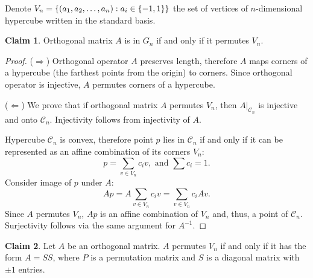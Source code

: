 \documentclass{article}
\theoremstyle{definition}
\newtheorem*{claim}{Claim}
\DeclarePairedDelimiter\set{\{}{\}}
\newcommand{\restrict}[1]{ \big|_{#1} }
\begin{document}
Denote $V_n = \set{ (a_1, a_2, \dots, a_n) : a_i \in \set{-1,1}}$ the set of vertices of $n$-dimensional hypercube written in the standard basis.

\begin{claim}
Orthogonal matrix $A$ is in $G_n$ if and only if it permutes $V_n$.
\end{claim}

\begin{proof}

($\Longrightarrow$)
Orthogonal operator $A$ preserves length, therefore $A$ maps corners of a hypercube (the farthest points from the origin) to corners.
Since orthogonal operator is injective, $A$ permutes corners of a hypercube.

($\Longleftarrow$)
We prove that if orthogonal matrix $A$ permutes $V_n$, then $A\restrict{\mathcal{C}_n}$ is injective and onto $\mathcal{C}_n$.
Injectivity follows from injectivity of $A$.

Hypercube $\mathcal{C}_n$ is convex, therefore point $p$ lies in $\mathcal{C}_n$ if and only if it can be represented as an affine combination of its corners $V_n$:
\[ p = \sum_{v \in V_n} c_i v, \text{ and } \sum c_i = 1. \]
Consider image of $p$ under $A$:
\[ Ap = A \sum_{v \in V_n} c_i v = \sum_{v \in V_n} c_i Av. \]
Since $A$ permutes $V_n$, $Ap$ is an affine combination of $V_n$ and, thus, a point of $\mathcal{C}_n$.
Surjectivity follows via the same argument for $A^{-1}$.

\end{proof}

\begin{claim}
Let $A$ be an orthogonal matrix.
$A$ permutes $V_n$ if and only if it has the form $A = SS$, where $P$ is a permutation matrix and $S$ is a diagonal matrix with $\pm 1$ entries.
\end{claim}
\end{document}
